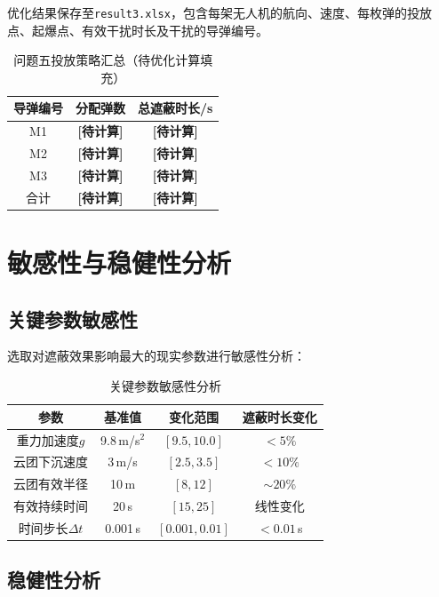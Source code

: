 \documentclass[a4paper]{ctexart}
\begin{document}
优化结果保存至\texttt{result3.xlsx}，包含每架无人机的航向、速度、每枚弹的投放点、起爆点、有效干扰时长及干扰的导弹编号。

\begin{table}[H]
\centering
{}
\caption{问题五投放策略汇总（待优化计算填充）}
\label{tab:q5_summary}
\begin{tabular}{c|c|c}
\toprule
导弹编号 & 分配弹数 & 总遮蔽时长/s \\
\midrule
M1 & \textbf{[待计算]} & \textbf{[待计算]} \\
M2 & \textbf{[待计算]} & \textbf{[待计算]} \\
M3 & \textbf{[待计算]} & \textbf{[待计算]} \\
\midrule
合计 & \textbf{[待计算]} & \textbf{[待计算]} \\
\bottomrule
\end{tabular}
\end{table}

\section{敏感性与稳健性分析}

\subsection{关键参数敏感性}

选取对遮蔽效果影响最大的现实参数进行敏感性分析：

\begin{table}[H]
\centering
{}
\caption{关键参数敏感性分析}
\label{tab:sensitivity}
\begin{tabular}{c|c|c|c}
\toprule
参数 & 基准值 & 变化范围 & 遮蔽时长变化 \\
\midrule
重力加速度$g$ & 9.8\,m/s$^2$ & $[9.5, 10.0]$ & $<5\%$ \\
云团下沉速度 & 3\,m/s & $[2.5, 3.5]$ & $<10\%$ \\
云团有效半径 & 10\,m & $[8, 12]$ & $\sim 20\%$ \\
有效持续时间 & 20\,s & $[15, 25]$ & 线性变化 \\
时间步长$\Delta t$ & 0.001\,s & $[0.001, 0.01]$ & $<0.01$\,s \\
\bottomrule
\end{tabular}
\end{table}

\subsection{稳健性分析}
\end{document}
